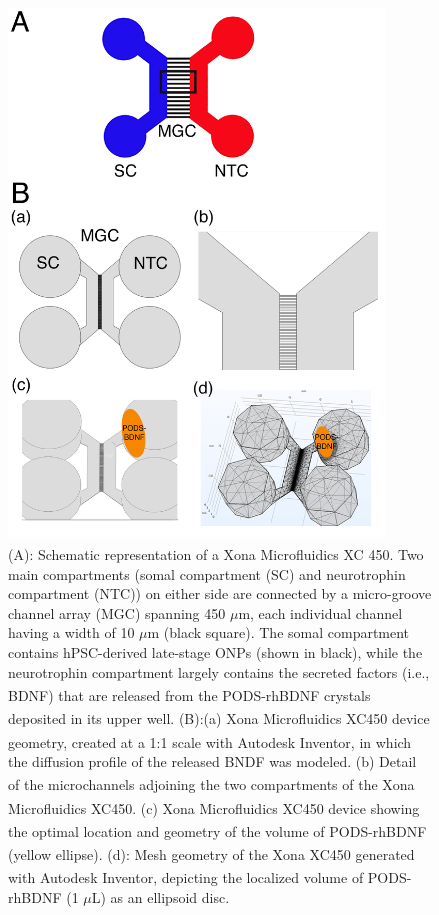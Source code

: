\documentclass[review]{elsarticle}
\begin{document}
\begin{figure}
	\begin{center}
		\includegraphics[width=10cm]{Fig_2.jpg} %
	\end{center}
	\caption{(A): Schematic representation of a Xona\textsuperscript{\texttrademark} Microfluidics XC 450. Two main compartments (somal compartment (SC) and neurotrophin compartment (NTC)) on either side are connected by a micro-groove channel array (MGC) spanning 450 $\mu$m, each individual channel having a width of 10 $\mu$m (black square). The somal compartment contains hPSC-derived late-stage ONPs (shown in black), while the neurotrophin compartment largely contains the secreted factors (i.e., BDNF) that are released from the PODS\textsuperscript{\textregistered}-rhBDNF crystals deposited in its upper well. (B):(a) Xona \textsuperscript{\texttrademark} Microfluidics XC450 device geometry, created at a 1:1 scale with Autodesk Inventor\textsuperscript{\textregistered}, in which the diffusion profile of the released BNDF was modeled. (b) Detail of the microchannels adjoining the two compartments of the Xona \textsuperscript{\texttrademark} Microfluidics XC450.  (c) Xona \textsuperscript{\texttrademark} Microfluidics XC450 device showing the optimal location and geometry of the volume of PODS\textsuperscript{\textregistered}-rhBDNF (yellow ellipse). (d): Mesh geometry of the Xona\textsuperscript{\texttrademark} XC450 generated with Autodesk Inventor, depicting the localized volume of PODS\textsuperscript{\textregistered}-rhBDNF (1 $\mu$L) as an ellipsoid disc.}
\end{figure}
\end{document}
